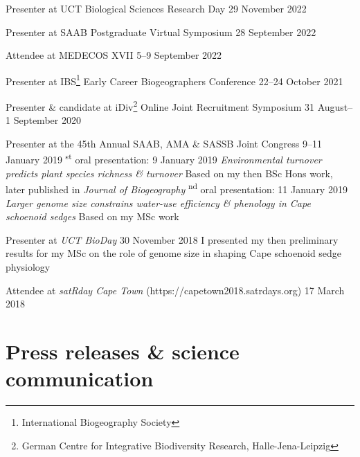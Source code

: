\documentclass[10pt]{article}
\begin{document}
\begin{hangparas}{2em}{1}

Presenter at UCT Biological Sciences Research Day        \hfill 29 November 2022

Presenter at SAAB Postgraduate Virtual Symposium        \hfill 28 September 2022

Attendee at MEDECOS XVII                              \hfill 5--9 September 2022

Presenter at IBS\footnote{International Biogeography Society}
Early Career Biogeographers Conference                \hfill 22--24 October 2021

Presenter \& candidate at iDiv\footnote{German Centre for Integrative
Biodiversity Research, Halle-Jena-Leipzig} Online Joint Recruitment Symposium
                                              \hfill 31 August--1 September 2020

Presenter at the 45th Annual SAAB, AMA \& SASSB Joint Congress
                                                \hfill 9--11 January 2019 \textsuperscript{st} oral presentation:            \hfill 9 January 2019 \break
\textit{Environmental turnover predicts plant species richness \& turnover}
                                                                          \break
Based on my then BSc Hons work, later published in \textit{Journal of 
  Biogeography}                                                           \textsuperscript{nd} oral presentation:           \hfill 11 January 2019 \break
\textit{Larger genome size constrains water-use efficiency \& phenology in Cape
  schoenoid sedges}                                                       \break
Based on my MSc work

Presenter at \textit{UCT BioDay}                  \hfill 30 November 2018 \break
I presented my then preliminary results for my MSc on the role of genome size in 
shaping Cape schoenoid sedge physiology

Attendee at \textit{satRday Cape Town} (https://capetown2018.satrdays.org)
                                                           \hfill 17 March 2018

\hfill

\end{hangparas}

\section*{Press releases \& science communication} %
\end{document}
